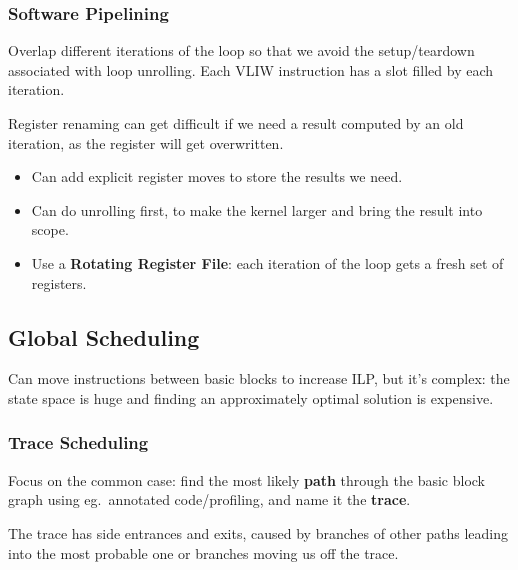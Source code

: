 \documentclass[a4paper,11pt]{article}
\begin{document}
{{        \subsubsection*{Software Pipelining}
        {
            Overlap different iterations of the loop so that we avoid the setup/teardown associated with loop unrolling. Each VLIW instruction has a slot filled by each iteration.

            Register renaming can get difficult if we need a result computed by an old iteration, as the register will get overwritten.

            \begin{itemize}
            \item Can add explicit register moves to store the results we need.
            \item Can do unrolling first, to make the kernel larger and bring the result into scope.
            \item Use a \textbf{Rotating Register File}: each iteration of the loop gets a fresh set of registers.
            \end{itemize}
        }
    }
    \subsection*{Global Scheduling}
    {
        Can move instructions between basic blocks to increase ILP, but it's complex: the state space is huge and finding an approximately optimal solution is expensive.

        \subsubsection*{Trace Scheduling}
        {
            \begin{minipage}[t]{0.55\textwidth}
            Focus on the common case: find the most likely \textbf{path} through the basic block graph using eg.\ annotated code/profiling, and name it the \textbf{trace}.

            The trace has side entrances and exits, caused by branches of other paths leading into the most probable one or branches moving us off the trace.


\end{minipage}}}}
\end{document}
